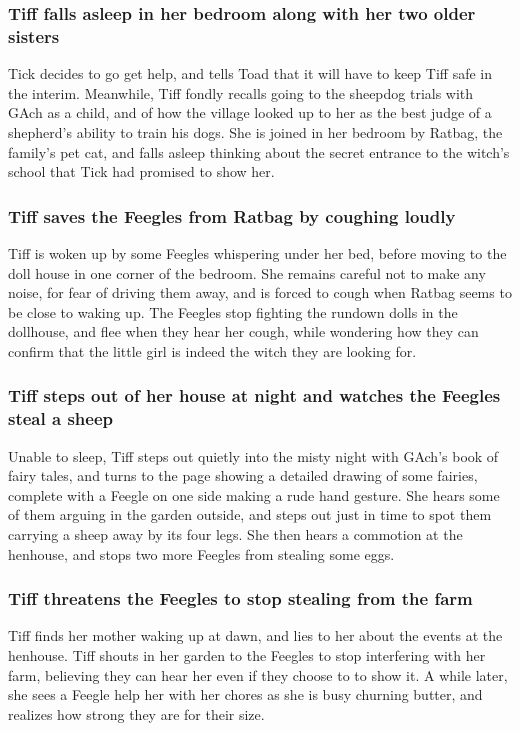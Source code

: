 \subsubsection{\Gls{Tiff} falls asleep in her bedroom along with her two older sisters}
\Gls{Tick} decides to go get help, and tells \Gls{Toad} that it will have to keep \Gls{Tiff} safe
in the interim. Meanwhile, \Gls{Tiff} fondly recalls going to the sheepdog trials with \Gls{GAch} as
a child, and of how the village looked up to her as the best judge of a shepherd's ability to train
his dogs. She is joined in her bedroom by \Gls{Ratbag}, the family's pet cat, and falls asleep
thinking about the secret entrance to the witch's school that \Gls{Tick} had promised to show her.

\subsubsection{\Gls{Tiff} saves the Feegles from \Gls{Ratbag} by coughing loudly}
\Gls{Tiff} is woken up by some Feegles whispering under her bed, before moving to the doll house in
one corner of the bedroom. She remains careful not to make any noise, for fear of driving them away,
and is forced to cough when \Gls{Ratbag} seems to be close to waking up. The Feegles stop fighting
the rundown dolls in the dollhouse, and flee when they hear her cough, while wondering how they can
confirm that the little girl is indeed the witch they are looking for.

\subsubsection{\Gls{Tiff} steps out of her house at night and watches the Feegles steal a sheep}
Unable to sleep, \Gls{Tiff} steps out quietly into the misty night with \Gls{GAch}'s book of fairy
tales, and turns to the page showing a detailed drawing of some fairies, complete with a Feegle
on one side making a rude hand gesture. She hears some of them arguing in the garden outside, and
steps out just in time to spot them carrying a sheep away by its four legs. She then hears a
commotion at the henhouse, and stops two more Feegles from stealing some eggs.

\subsubsection{\Gls{Tiff} threatens the Feegles to stop stealing from the farm}
\Gls{Tiff} finds her mother waking up at dawn, and lies to her about the events at the henhouse.
\Gls{Tiff} shouts in her garden to the Feegles to stop interfering with her farm, believing they
can hear her even if they choose to to show it. A while later, she sees a Feegle help her with her
chores as she is busy churning butter, and realizes how strong they are for their size.

